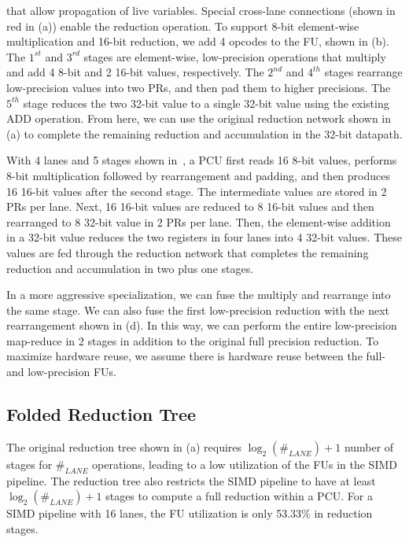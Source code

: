   that allow propagation of live variables.
Special cross-lane connections (shown in red in  (a)) enable the reduction
operation.
To support 8-bit element-wise multiplication and 16-bit reduction, we add 4 opcodes to the FU, shown in
 (b).
The $1^{st}$ and $3^{rd}$ stages are element-wise, low-precision operations
  that multiply and add 4 8-bit and 2 16-bit values, respectively.
The $2^{nd}$ and $4^{th}$ stages rearrange low-precision values into two PRs,
  and then pad them to higher precisions.
The $5^{th}$ stage reduces the two 32-bit value to a single 32-bit value using the existing ADD operation. 
From here, we can use the original reduction network shown in  (a) to
complete the remaining reduction and accumulation in the 32-bit datapath.

With 4 lanes and 5 stages shown in~,
  a PCU first reads 16 8-bit values,
  performs 8-bit multiplication followed by rearrangement and padding,
  and then produces 16 16-bit values after the second stage.
The intermediate values are stored in 2 PRs per lane.
Next, 16 16-bit values are reduced to 8 16-bit values
  and then rearranged to 8 32-bit value in 2 PRs per lane.
Then, the element-wise addition in a 32-bit value
  reduces the two registers in four lanes into 4 32-bit values.
These values are fed through the
  reduction network that completes the remaining
  reduction and accumulation in two plus one stages.

In a more aggressive specialization,
  we can fuse the multiply and rearrange into the same stage.
We can also fuse the first low-precision reduction with the next rearrangement shown in  (d).
In this way, we can perform the entire low-precision map-reduce in 2 stages in addition to the original full precision reduction.
To maximize hardware reuse,
we assume there is hardware reuse between the full- and low-precision FUs.

\subsection{Folded Reduction Tree} \label{sec:foldrt}
The original reduction tree shown in  (a) requires $\log_2(\#_{LANE})+1$ number of
stages for $\#_{LANE}$ operations, leading to a low utilization of the FUs in the SIMD pipeline.
The reduction tree also restricts the SIMD pipeline to have at least 
$\log_2(\#_{LANE})+1$ stages to compute a full reduction within a PCU.
For a SIMD pipeline with 16 lanes, the FU utilization is only 53.33\% in reduction stages.

